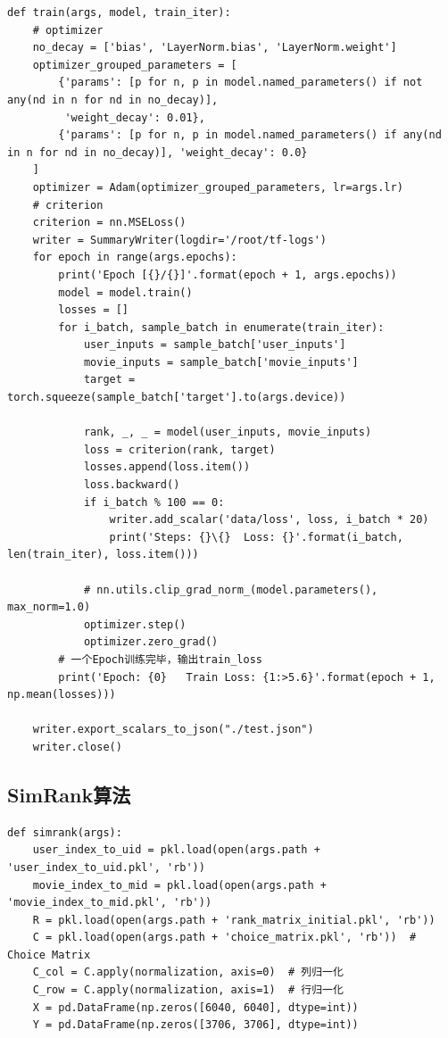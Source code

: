 \begin{spacing}{1.5}
\begin{lstlisting}
def train(args, model, train_iter):
    # optimizer
    no_decay = ['bias', 'LayerNorm.bias', 'LayerNorm.weight']
    optimizer_grouped_parameters = [
        {'params': [p for n, p in model.named_parameters() if not any(nd in n for nd in no_decay)],
         'weight_decay': 0.01},
        {'params': [p for n, p in model.named_parameters() if any(nd in n for nd in no_decay)], 'weight_decay': 0.0}
    ]
    optimizer = Adam(optimizer_grouped_parameters, lr=args.lr)
    # criterion
    criterion = nn.MSELoss()
    writer = SummaryWriter(logdir='/root/tf-logs')
    for epoch in range(args.epochs):
        print('Epoch [{}/{}]'.format(epoch + 1, args.epochs))
        model = model.train()
        losses = []
        for i_batch, sample_batch in enumerate(train_iter):
            user_inputs = sample_batch['user_inputs']
            movie_inputs = sample_batch['movie_inputs']
            target = torch.squeeze(sample_batch['target'].to(args.device))
            
            rank, _, _ = model(user_inputs, movie_inputs)
            loss = criterion(rank, target)
            losses.append(loss.item())
            loss.backward()
            if i_batch % 100 == 0:
                writer.add_scalar('data/loss', loss, i_batch * 20)
                print('Steps: {}\{}  Loss: {}'.format(i_batch, len(train_iter), loss.item()))
            
            # nn.utils.clip_grad_norm_(model.parameters(), max_norm=1.0)
            optimizer.step()
            optimizer.zero_grad()
        # 一个Epoch训练完毕，输出train_loss
        print('Epoch: {0}   Train Loss: {1:>5.6}'.format(epoch + 1, np.mean(losses)))
    
    writer.export_scalars_to_json("./test.json")
    writer.close()
\end{lstlisting}\par
\subsection{SimRank算法}
\begin{lstlisting}
def simrank(args):
    user_index_to_uid = pkl.load(open(args.path + 'user_index_to_uid.pkl', 'rb'))
    movie_index_to_mid = pkl.load(open(args.path + 'movie_index_to_mid.pkl', 'rb'))
    R = pkl.load(open(args.path + 'rank_matrix_initial.pkl', 'rb'))
    C = pkl.load(open(args.path + 'choice_matrix.pkl', 'rb'))  # Choice Matrix
    C_col = C.apply(normalization, axis=0)  # 列归一化
    C_row = C.apply(normalization, axis=1)  # 行归一化
    X = pd.DataFrame(np.zeros([6040, 6040], dtype=int))
    Y = pd.DataFrame(np.zeros([3706, 3706], dtype=int))
    

\end{lstlisting}
\end{spacing}
